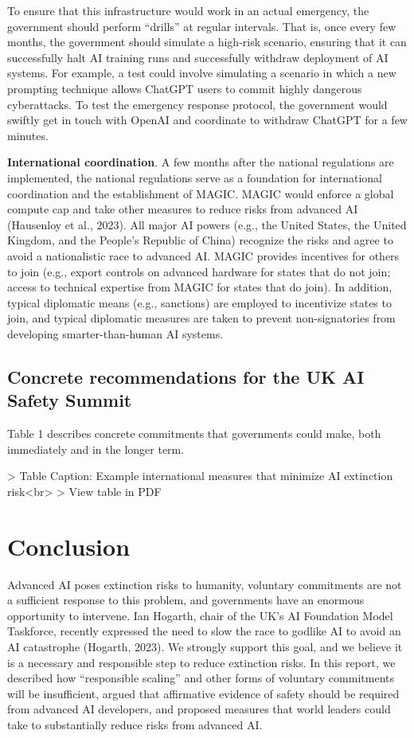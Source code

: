 \documentclass[12pt,a4paper]{article}
\begin{document}
To ensure that this infrastructure would work in an actual emergency, the government should perform “drills” at regular intervals. That is, once every few months, the government should simulate a high-risk scenario, ensuring that it can successfully halt AI training runs and successfully withdraw deployment of AI systems. For example, a test could involve simulating a scenario in which a new prompting technique allows ChatGPT users to commit highly dangerous cyberattacks. To test the emergency response protocol, the government would swiftly get in touch with OpenAI and coordinate to withdraw ChatGPT for a few minutes. 

\textbf{International coordination}. A few months after the national regulations are implemented, the national regulations serve as a foundation for international coordination and the establishment of MAGIC. MAGIC would enforce a global compute cap and take other measures to reduce risks from advanced AI (Hausenloy et al., 2023). All major AI powers (e.g., the United States, the United Kingdom, and the People’s Republic of China) recognize the risks and agree to avoid a nationalistic race to advanced AI. MAGIC provides incentives for others to join (e.g., export controls on advanced hardware for states that do not join; access to technical expertise from MAGIC for states that do join). In addition, typical diplomatic means (e.g., sanctions) are employed to incentivize states to join, and typical diplomatic measures are taken to prevent non-signatories from developing smarter-than-human AI systems.

\subsection{Concrete recommendations for the UK AI Safety Summit}

Table 1 describes concrete commitments that governments could make, both immediately and in the longer term.

\begin{table}
> Table Caption: Example international measures that minimize AI extinction risk<br>
> View table in PDF
\end{table}

\newpage
\newpage
\section{Conclusion}
Advanced AI poses extinction risks to humanity, voluntary commitments are not a sufficient response to this problem, and governments have an enormous opportunity to intervene. Ian Hogarth, chair of the UK’s AI Foundation Model Taskforce, recently expressed the need to slow the race to godlike AI to avoid an AI catastrophe (Hogarth, 2023). We strongly support this goal, and we believe it is a necessary and responsible step to reduce extinction risks. In this report, we described how “responsible scaling” and other forms of voluntary commitments will be insufficient, argued that affirmative evidence of safety should be required from advanced AI developers, and proposed measures that world leaders could take to substantially reduce risks from advanced AI. 
\end{document}
